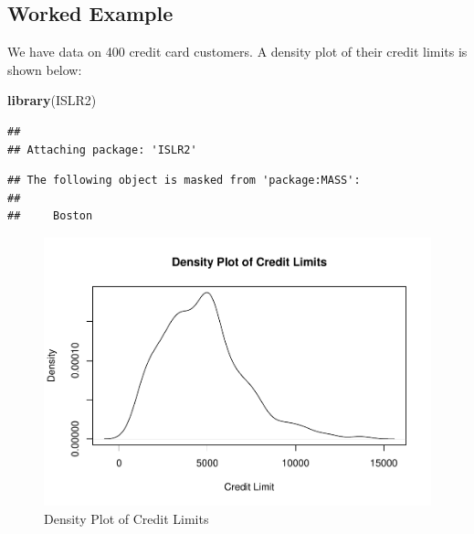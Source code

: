\documentclass[
]{book}
\newenvironment{Shaded}{\begin{snugshade}}{\end{snugshade}}
\newcommand{\AttributeTok}[1]{\textcolor[rgb]{0.13,0.29,0.53}{#1}}
\newcommand{\FunctionTok}[1]{\textcolor[rgb]{0.13,0.29,0.53}{\textbf{#1}}}
\newcommand{\NormalTok}[1]{#1}
\newcommand{\OtherTok}[1]{\textcolor[rgb]{0.56,0.35,0.01}{#1}}
\newcommand{\SpecialCharTok}[1]{\textcolor[rgb]{0.81,0.36,0.00}{\textbf{#1}}}
\newcommand{\StringTok}[1]{\textcolor[rgb]{0.31,0.60,0.02}{#1}}
\begin{document}
\subsection{Worked Example}\label{worked-example-5}

We have data on 400 credit card customers. A density plot of their credit limits is shown below:

\begin{Shaded}
\begin{Highlighting}[]
\FunctionTok{library}\NormalTok{(ISLR2)}
\end{Highlighting}
\end{Shaded}

\begin{verbatim}
## 
## Attaching package: 'ISLR2'
\end{verbatim}

\begin{verbatim}
## The following object is masked from 'package:MASS':
## 
##     Boston
\end{verbatim}

\begin{Shaded}
\end{Shaded}

\begin{figure}
\centering
\includegraphics{bookdown-demo_files/figure-latex/8-credit-1.pdf}
\caption{\label{fig:8-credit}Density Plot of Credit Limits}
\end{figure}
\end{document}
